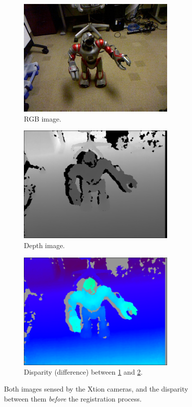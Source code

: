 		\begin{figure}[h]
			\centering
			\begin{subfigure}[h]{0.4\linewidth}
				\centering
				\includegraphics[width=3in]{images/rgb_before}
				\caption{RGB image.}
				\label{fig:3_rgb_bef_reg}
			\end{subfigure}
			\hfill
			\begin{subfigure}[h]{0.4\linewidth}
				\centering
				\includegraphics[width=3in]{images/depth_before}
				\caption{Depth image.}
				\label{fig:3_depth_bef_reg}
			\end{subfigure}
			
			\begin{subfigure}[h]{0.9\linewidth}
				\centering
				\includegraphics[width=3in]{images/disparity_before}
				\caption{Disparity (difference) between \ref{fig:3_rgb_bef_reg} and \ref{fig:3_depth_bef_reg}.}
				\label{fig:3_disparity_bef_reg}
			\end{subfigure}
			
			\caption{Both images sensed by the Xtion cameras, and the disparity between them \emph{before} the registration process.}
			\label{fig:3_bef_reg}
		\end{figure}
		

